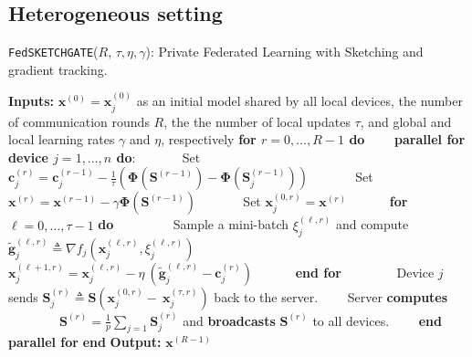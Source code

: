 




\subsection{Heterogeneous setting}

\begin{algorithm}[H]
\caption{\texttt{FedSKETCHGATE}($R$, $\tau, \eta, \gamma$): Private Federated Learning with Sketching and gradient tracking. }\label{Alg:PFLHet}
\begin{algorithmic}[1]
\State \textbf{Inputs:} $\boldsymbol{x}^{(0)}=\boldsymbol{x}^{(0)}_j$ as an initial  model shared by all local devices, the number of communication rounds $R$, the the number of local updates $\tau$, and global and local learning rates $\gamma$ and $\eta$, respectively
\State \textbf{for $r=0, \ldots, R-1$ do}
\State $\qquad$\textbf{parallel for device $j=1,\ldots,n$ do}:
\State $\qquad\quad$ Set $\mathbf{c}_j^{(r)}=\mathbf{c}_j^{(r-1)}-\frac{1}{\tau}\left(\mathbf{\Phi}\left(\mathbf{S}^{(r-1)}\right)-\mathbf{\Phi}\left(\mathbf{S}^{(r-1)}_{j}\right)\right)$
\State $\qquad\quad$ Set $\boldsymbol{x}^{(r)}=\boldsymbol{x}^{(r-1)}-\gamma\mathbf{\Phi}\left(\mathbf{S}^{(r-1)}\right)$
\State $\qquad\quad$ Set $\boldsymbol{x}_j^{(0,r)}=\boldsymbol{x}^{(r)}$ %
\State $\qquad\quad $\textbf{for} $\ell=0,\ldots,\tau-1$ \textbf{do}
\State $\qquad\quad\quad$ Sample a mini-batch $\xi_j^{(\ell,r)}$ and compute $\tilde{\mathbf{g}}_{j}^{(\ell,r)}\triangleq\nabla{f}_j(\boldsymbol{x}^{(\ell,r)}_j,\xi_j^{(\ell,r)})$
\State $\qquad\quad\quad$ $\boldsymbol{x}^{(\ell+1,r)}_{j}=\boldsymbol{x}^{(\ell,r)}_j-\eta~\left( \tilde{\mathbf{g}}_{j}^{(\ell,r)}-\mathbf{c}_j^{(r)}\right)$ \label{eq:update-rule-alg}
\State $\qquad\quad$\textbf{end for}
\State $\qquad\quad\quad$Device $j$ sends $\mathbf{S}^{(r)}_{j}\triangleq\mathbf{S}\left(\boldsymbol{x}_j^{(0,r)}-~{\boldsymbol{x}}_{j}^{(\tau,r)}\right)$ back to the server.
\State $\qquad$Server \textbf{computes} 
\State $\qquad\qquad {\mathbf{S}}^{(r)}=\frac{1}{p}\sum_{j=1}\mathbf{S}^{(r)}_{j}$ and  \textbf{broadcasts} ${\mathbf{S}}^{(r)}$ to all devices.
\State $\qquad$\textbf{end parallel for}
\State \textbf{end}
\State \textbf{Output:} ${\boldsymbol{x}}^{(R-1)}$
\vspace{- 0.1cm}
\end{algorithmic}
\end{algorithm}



